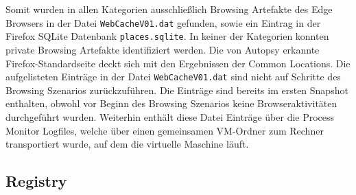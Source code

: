 \begin{appendices}
		Somit wurden in allen Kategorien ausschließlich Browsing Artefakte des Edge Browsers in der Datei \texttt{WebCacheV01.dat} gefunden, sowie ein Eintrag in der Firefox SQLite Datenbank \texttt{places.sqlite}. In keiner der Kategorien konnten private Browsing Artefakte identifiziert werden. Die von Autopsy erkannte Firefox-Standardseite deckt sich mit den Ergebnissen der Common Locations. Die aufgelisteten Einträge in der Datei \texttt{WebCacheV01.dat} sind nicht auf Schritte des Browsing Szenarios zurückzuführen. Die Einträge sind bereits im ersten Snapshot enthalten, obwohl vor Beginn des Browsing Szenarios keine Browseraktivitäten durchgeführt wurden. Weiterhin enthält diese Datei Einträge über die Process Monitor Logfiles, welche über einen gemeinsamen VM-Ordner zum Rechner transportiert wurde, auf dem die virtuelle Maschine läuft.
		
		
		\subsection*{Registry}
		\label{subsection:appendix-firefox-registry}
		

\end{appendices}
